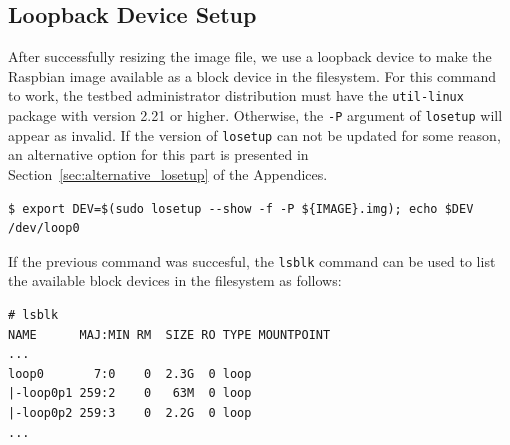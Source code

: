 \documentclass[electronics,article,accept,moreauthors,pdftex,10pt,a4paper]{mdpi}
\theoremstyle{mdpi}
\newcounter{ex}
\newcounter{re}
\theoremstyle{mdpidefinition}
\begin{document}




\subsection{Loopback Device Setup}
After successfully resizing the image file, we use a loopback device to make
the Raspbian image available as a block device in the filesystem. For this
command to work, the testbed administrator distribution must have the
\texttt{util-linux} package with version 2.21 or higher. Otherwise, the
\texttt{-P} argument of \texttt{losetup} will appear as invalid. If the
version of \texttt{losetup} can not be updated for some reason, an
alternative option for this part is presented in
Section~\ref{sec:alternative_losetup} of the Appendices.

\begin{lstlisting}[]
$ export DEV=$(sudo losetup --show -f -P ${IMAGE}.img); echo $DEV
/dev/loop0
\end{lstlisting}
\FloatBarrier
\vspace{-5mm}

If the previous command was succesful, the \texttt{lsblk} command can be used
to list the available block devices in the filesystem as follows:

\begin{lstlisting}[]
# lsblk
NAME      MAJ:MIN RM  SIZE RO TYPE MOUNTPOINT
...
loop0       7:0    0  2.3G  0 loop
|-loop0p1 259:2    0   63M  0 loop
|-loop0p2 259:3    0  2.2G  0 loop
...
\end{lstlisting}
\FloatBarrier
\vspace{-5mm}
\end{document}
